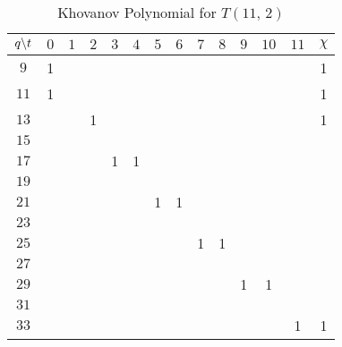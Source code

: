 \documentclass{article}
\theoremstyle{plain}
\begin{document}
        \begin{table}[H]
            \centering
            \begin{tabular}{| c | c | c | c | c | c | c | c | c | c | c | c | c | c |}
                \hline
                $q\symbol{92}t$&$0$&$1$&$2$&$3$&$4$&$5$&$6$&$7$&$8$&$9$&$10$&$11$&$\chi$\\
                \hline
                $9$&1&&&&&&&&&&&&1\\
                \hline
                $11$&1&&&&&&&&&&&&1\\
                \hline
                $13$&&&1&&&&&&&&&&1\\
                \hline
                $15$&&&&&&&&&&&&&\\
                \hline
                $17$&&&&1&1&&&&&&&&\\
                \hline
                $19$&&&&&&&&&&&&&\\
                \hline
                $21$&&&&&&1&1&&&&&&\\
                \hline
                $23$&&&&&&&&&&&&&\\
                \hline
                $25$&&&&&&&&1&1&&&&\\
                \hline
                $27$&&&&&&&&&&&&&\\
                \hline
                $29$&&&&&&&&&&1&1&&\\
                \hline
                $31$&&&&&&&&&&&&&\\
                \hline
                $33$&&&&&&&&&&&&1&1\\
                \hline
            \end{tabular}
            \caption{Khovanov Polynomial for $T(11,\,2)$}
            \label{table:t_2_11_kho}
        \end{table}
\end{document}
